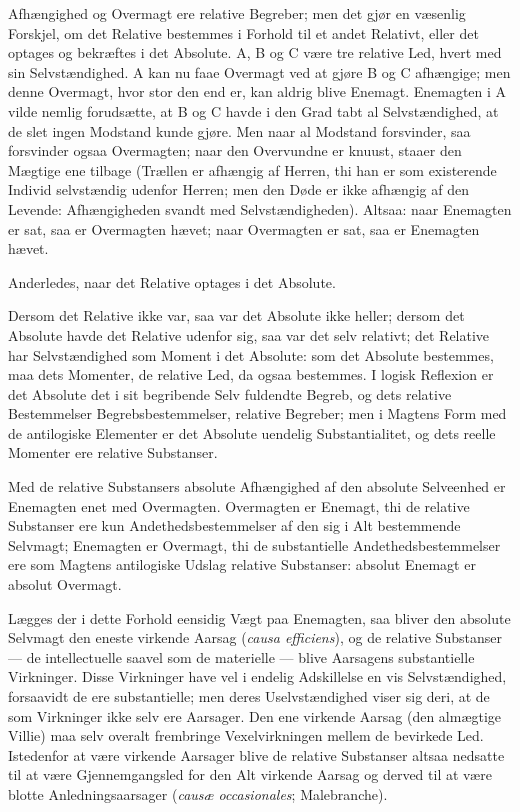 \documentclass[12pt]{book}
\newcommand{\opage}[1]{\marginnote{\footnotesize\textit{[#1]}}}
\begin{document}
Afhængighed og
Overmagt ere relative Begreber; men det gjør en væsenlig
Forskjel, om det Relative bestemmes i Forhold til et andet
Relativt, eller det optages og bekræftes i det Absolute. A, B og
C være tre relative Led, hvert med sin Selvstændighed. A
kan nu faae Overmagt ved at gjøre B og C afhængige; men
denne Overmagt, hvor stor den end er, kan aldrig blive
Enemagt. Enemagten i A vilde nemlig forudsætte, at B og C
havde i den Grad tabt al Selvstændighed, at de slet ingen
Modstand kunde gjøre. Men naar al Modstand forsvinder,
saa forsvinder ogsaa Overmagten; naar den Overvundne er
knuust, staaer den Mægtige ene tilbage (Trællen er afhængig
af Herren, thi han er som existerende Individ selvstændig
\opage{40} udenfor Herren; men den Døde er ikke afhængig af den
Levende: Afhængigheden svandt med Selvstændigheden).
Altsaa: naar Enemagten er sat, saa er Overmagten hævet; naar
Overmagten er sat, saa er Enemagten hævet.

Anderledes, naar det Relative optages i det Absolute.

Dersom det Relative ikke var, saa var det Absolute ikke
heller; dersom det Absolute havde det Relative udenfor sig,
saa var det selv relativt; det Relative har Selvstændighed
som Moment i det Absolute: som det Absolute bestemmes,
maa dets Momenter, de relative Led, da ogsaa bestemmes.
I logisk Reflexion er det Absolute det i sit begribende Selv
fuldendte Begreb, og dets relative Bestemmelser
Begrebsbestemmelser, relative Begreber; men i Magtens Form med
de antilogiske Elementer er det Absolute uendelig
Substantialitet, og dets reelle Momenter ere relative Substanser.

Med de relative Substansers absolute Afhængighed af
den absolute Selveenhed er Enemagten enet med
Overmagten. Overmagten er Enemagt, thi de relative Substanser
ere kun Andethedsbestemmelser af den sig i Alt bestemmende
Selvmagt; Enemagten er Overmagt, thi de substantielle
Andethedsbestemmelser ere som Magtens antilogiske Udslag
relative Substanser: absolut Enemagt er absolut Overmagt.

Lægges der i dette Forhold eensidig Vægt paa
Enemagten, saa bliver den absolute Selvmagt den eneste virkende
Aarsag (\textit{causa efficiens}), og de relative Substanser ---
de intellectuelle saavel som de materielle --- blive Aarsagens
substantielle Virkninger. Disse Virkninger have vel i
endelig Adskillelse en vis Selvstændighed, forsaavidt de ere
substantielle; men deres Uselvstændighed viser sig deri, at de som
Virkninger ikke selv ere Aarsager. Den ene virkende Aarsag
(den almægtige Villie) maa selv overalt frembringe
Vexelvirkningen mellem de bevirkede Led. Istedenfor at være
virkende Aarsager blive de relative Substanser altsaa nedsatte til
at være Gjennemgangsled for den Alt virkende Aarsag og
\opage{41} derved til at være blotte Anledningsaarsager (\textit{causæ
occasionales}; Malebranche).
\end{document}
